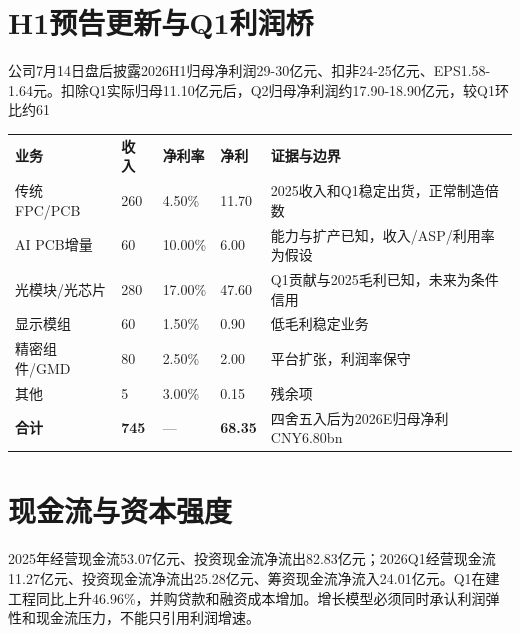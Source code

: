 
\section{H1预告更新与Q1利润桥}
公司7月14日盘后披露2026H1归母净利润29-30亿元、扣非24-25亿元、EPS1.58-1.64元。扣除Q1实际归母11.10亿元后，Q2归母净利润约17.90-18.90亿元，较Q1环比约61%

\begin{exhibitbox}
\begin{tabularx}{\exhibitboxwidth}{L{3.1cm}R{1.7cm}R{1.7cm}R{1.8cm}X}
\textbf{业务} & \textbf{收入} & \textbf{净利率} & \textbf{净利} & \textbf{证据与边界} \\
传统FPC/PCB & 260 & 4.50\% & 11.70 & 2025收入和Q1稳定出货，正常制造倍数 \\
AI PCB增量 & 60 & 10.00\% & 6.00 & 能力与扩产已知，收入/ASP/利用率为假设 \\
光模块/光芯片 & 280 & 17.00\% & 47.60 & Q1贡献与2025毛利已知，未来为条件信用 \\
显示模组 & 60 & 1.50\% & 0.90 & 低毛利稳定业务 \\
精密组件/GMD & 80 & 2.50\% & 2.00 & 平台扩张，利润率保守 \\
其他 & 5 & 3.00\% & 0.15 & 残余项 \\
\textbf{合计} & \textbf{745} & — & \textbf{68.35} & 四舍五入后为2026E归母净利CNY6.80bn \\
\end{tabularx}
\end{exhibitbox}

\section{现金流与资本强度}
2025年经营现金流53.07亿元、投资现金流净流出82.83亿元；2026Q1经营现金流11.27亿元、投资现金流净流出25.28亿元、筹资现金流净流入24.01亿元。Q1在建工程同比上升46.96\%，并购贷款和融资成本增加。增长模型必须同时承认利润弹性和现金流压力，不能只引用利润增速。

